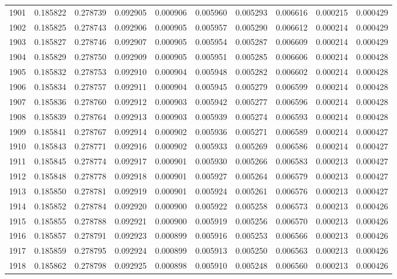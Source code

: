 \begin{tabular}{lrrrrrrrrr}
1901 & 0.185822 & 0.278739 & 0.092905 & 0.000906 & 0.005960 & 0.005293 & 0.006616 & 0.000215 & 0.000429 \\
1902 & 0.185825 & 0.278743 & 0.092906 & 0.000905 & 0.005957 & 0.005290 & 0.006612 & 0.000214 & 0.000429 \\
1903 & 0.185827 & 0.278746 & 0.092907 & 0.000905 & 0.005954 & 0.005287 & 0.006609 & 0.000214 & 0.000429 \\
1904 & 0.185829 & 0.278750 & 0.092909 & 0.000905 & 0.005951 & 0.005285 & 0.006606 & 0.000214 & 0.000428 \\
1905 & 0.185832 & 0.278753 & 0.092910 & 0.000904 & 0.005948 & 0.005282 & 0.006602 & 0.000214 & 0.000428 \\
1906 & 0.185834 & 0.278757 & 0.092911 & 0.000904 & 0.005945 & 0.005279 & 0.006599 & 0.000214 & 0.000428 \\
1907 & 0.185836 & 0.278760 & 0.092912 & 0.000903 & 0.005942 & 0.005277 & 0.006596 & 0.000214 & 0.000428 \\
1908 & 0.185839 & 0.278764 & 0.092913 & 0.000903 & 0.005939 & 0.005274 & 0.006593 & 0.000214 & 0.000428 \\
1909 & 0.185841 & 0.278767 & 0.092914 & 0.000902 & 0.005936 & 0.005271 & 0.006589 & 0.000214 & 0.000427 \\
1910 & 0.185843 & 0.278771 & 0.092916 & 0.000902 & 0.005933 & 0.005269 & 0.006586 & 0.000214 & 0.000427 \\
1911 & 0.185845 & 0.278774 & 0.092917 & 0.000901 & 0.005930 & 0.005266 & 0.006583 & 0.000213 & 0.000427 \\
1912 & 0.185848 & 0.278778 & 0.092918 & 0.000901 & 0.005927 & 0.005264 & 0.006579 & 0.000213 & 0.000427 \\
1913 & 0.185850 & 0.278781 & 0.092919 & 0.000901 & 0.005924 & 0.005261 & 0.006576 & 0.000213 & 0.000427 \\
1914 & 0.185852 & 0.278784 & 0.092920 & 0.000900 & 0.005922 & 0.005258 & 0.006573 & 0.000213 & 0.000426 \\
1915 & 0.185855 & 0.278788 & 0.092921 & 0.000900 & 0.005919 & 0.005256 & 0.006570 & 0.000213 & 0.000426 \\
1916 & 0.185857 & 0.278791 & 0.092923 & 0.000899 & 0.005916 & 0.005253 & 0.006566 & 0.000213 & 0.000426 \\
1917 & 0.185859 & 0.278795 & 0.092924 & 0.000899 & 0.005913 & 0.005250 & 0.006563 & 0.000213 & 0.000426 \\
1918 & 0.185862 & 0.278798 & 0.092925 & 0.000898 & 0.005910 & 0.005248 & 0.006560 & 0.000213 & 0.000426 \\

\end{tabular}
